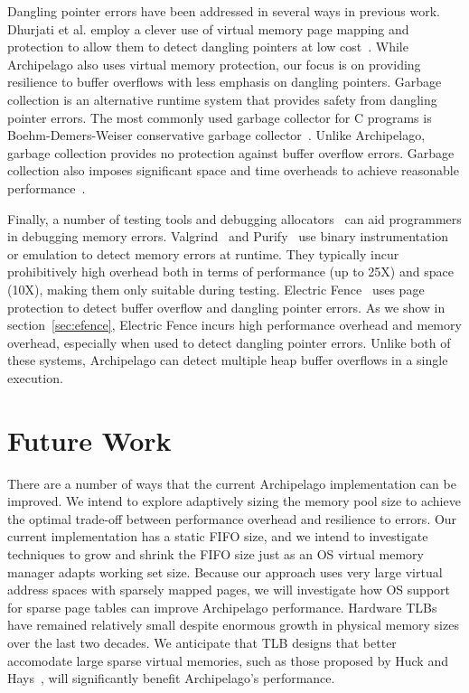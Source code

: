 \documentclass{acm_proc_article-sp}
\begin{document}
Dangling pointer errors have been addressed in several ways in
previous work.  Dhurjati et al. employ a clever use of virtual memory
page mapping and protection to allow them to detect dangling pointers
at low cost~\cite{dhurjati06}.  While Archipelago also uses virtual
memory protection, our focus is on providing resilience to buffer
overflows with less emphasis on dangling pointers.  Garbage collection
is an alternative runtime system that provides safety from dangling
pointer errors. The most commonly used garbage collector for C
programs is Boehm-Demers-Weiser conservative garbage
collector~\cite{boeh88}.  Unlike Archipelago, garbage collection
provides no protection against buffer overflow errors. Garbage
collection also imposes significant space and time overheads to
achieve reasonable performance~\cite{hert05a}.


Finally, a number of testing tools and debugging
allocators~\cite{1168884,pageheap,efence} can aid programmers in
debugging memory
errors. Valgrind~\cite{Net:bounds-checking2004,Sew:memcheck2005} and
Purify~\cite{Hastings:91} use binary instrumentation or emulation to
detect memory errors at runtime. They typically incur prohibitively
high overhead both in terms of performance (up to 25X) and space
(10X), making them only suitable during testing. Electric
Fence~\cite{efence} uses page protection to detect buffer overflow and
dangling pointer errors. As we show in section~\ref{sec:efence},
Electric Fence incurs high performance overhead and memory overhead,
especially when used to detect dangling pointer errors. Unlike both of
these systems, Archipelago can detect multiple heap buffer overflows
in a single execution.



\section{Future Work}
\label{sec:future}

There are a number of ways that the current Archipelago implementation
can be improved.  We intend to explore adaptively sizing the memory
pool size to achieve the optimal trade-off between performance
overhead and resilience to errors.  Our current implementation has a
static FIFO size, and we intend to investigate techniques to grow and
shrink the FIFO size just as an OS virtual memory manager adapts
working set size.  Because our approach uses very large virtual
address spaces with sparsely mapped pages, we will investigate how OS
support for sparse page tables can improve Archipelago performance.
Hardware TLBs have remained relatively small despite enormous growth
in physical memory sizes over the last two decades.  We anticipate
that TLB designs that better accomodate large sparse virtual memories,
such as those proposed by Huck and Hays~\cite{huck93isca}, will significantly
benefit Archipelago's performance.
\end{document}
